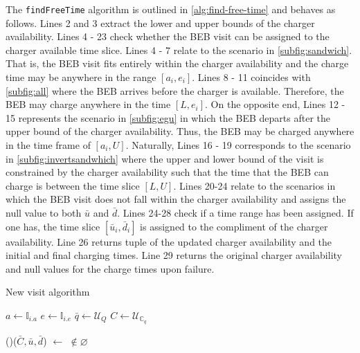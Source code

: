 \documentclass[11pt,a4paper,final]{article}
\newcommand{\I}{\mathbb{I}}                 %
\newcommand{\C}{\mathbb{C}}                 %
\newcommand{\Sol}{\mathbb{S}}               %
\begin{document}
The \texttt{findFreeTime} algorithm is outlined in \ref{alg:find-free-time} and behaves as follows. Lines 2 and 3 extract the
lower and upper bounds of the charger availability. Lines 4 - 23 check whether the BEB visit can be assigned to the
charger available time slice. Lines 4 - 7 relate to the scenario in \ref{subfig:sandwich}. That is, the BEB visit fits
entirely within the charger availability and the charge time may be anywhere in the range \([a_i, e_i]\). Lines 8 - 11
coincides with \ref{subfig:all} where the BEB arrives before the charger is available. Therefore, the BEB may charge
anywhere in the time \([L, e_i]\). On the opposite end, Lines 12 - 15 represents the scenario in \ref{subfig:egu} in which
the BEB departs after the upper bound of the charger availability. Thus, the BEB may be charged anywhere in the time
frame of \([a_i, U]\). Naturally, Lines 16 - 19 corresponds to the scenario in \ref{subfig:invertsandwhich} where the
upper and lower bound of the visit is constrained by the charger availability such that the time that the BEB can charge
is between the time slice \([L,U]\). Lines 20-24 relate to the scenarios in which the BEB visit does not fall within the
charger availability and assigns the null value to both \(\bar{u}\) and \(\bar{d}\). Lines 24-28 check if a time range has
been assigned. If one has, the time slice \([\bar{u}_i, \bar{d}_i]\) is assigned to the compliment of the charger
availability. Line 26 returns tuple of the updated charger availability and the initial and final charging times. Line
29 returns the original charger availability and null values for the charge times upon failure.

\begin{algorithm}[H]
  \caption{New visit algorithm} \label{alg:new-visit}
  \LinesNumbered
  \KwIn{$\Sol$}
  \KwOut{$\bar{\Sol}$}


  \Begin
    {
      $a \leftarrow \I_{i.a}$
      $e \leftarrow \I_{i.e}$
      $\bar{q} \leftarrow \mathcal{U}_{Q}$
      $C \leftarrow \mathcal{U}_{\C_q}$\tcc*{Select a random time slice from $\C_q$}

      \If(){($\bar{C}, \bar{u}, \bar{d}$) $\leftarrow$  $\not\in \varnothing$}
         {
         }

         \Return{($\varnothing$)}
    }
\end{algorithm}
\end{document}

